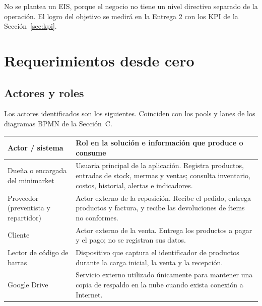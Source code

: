 \documentclass[10pt,a4paper]{article}
\begin{document}
No se plantea un EIS, porque el negocio no tiene un nivel directivo separado de la operación. El logro del objetivo se medirá en la Entrega 2 con los KPI de la Sección~\ref{sec:kpi}.

\section{Requerimientos desde cero}

\subsection{Actores y roles}

Los actores identificados son los siguientes. Coinciden con los pools y lanes de los diagramas BPMN de la Sección~C.

\begin{longtable}{|p{}|p{}|}
\hline
\textbf{Actor / sistema} & \textbf{Rol en la solución e información que produce o consume} \\
\hline
Dueña o encargada del minimarket & Usuaria principal de la aplicación. Registra productos, entradas de stock, mermas y ventas; consulta inventario, costos, historial, alertas e indicadores. \\
\hline
Proveedor (preventista y repartidor) & Actor externo de la reposición. Recibe el pedido, entrega productos y factura, y recibe las devoluciones de ítems no conformes. \\
\hline
Cliente & Actor externo de la venta. Entrega los productos a pagar y el pago; no se registran sus datos. \\
\hline
Lector de código de barras & Dispositivo que captura el identificador de productos durante la carga inicial, la venta y la recepción. \\
\hline
Google Drive & Servicio externo utilizado únicamente para mantener una copia de respaldo en la nube cuando exista conexión a Internet. \\
\hline
\end{longtable}
\end{document}
